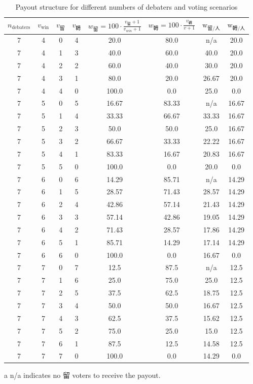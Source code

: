 \begin{table}[h]
    \centering
    \small
    \begin{threeparttable}
    \begin{tabular}{cccccccc}
    \toprule
    $n_{\text{debaters}}$ & $v_{\text{win}}$ & $v_{\text{留}}$ & $v_{\text{轉}}$ & $w_{\text{留}} = 100 \cdot \frac{v_{\text{留}}+1}{v_{win}+1} $ & $w_{\text{轉}} = 100\cdot\frac{v_{\text{轉}}}{v+1}$ & $\text{w}_{\text{留}/\text{人} }$ & $\text{w}_{\text{轉}/\text{人}}$ \\
    \midrule
7 & 4 & 0 & 4 & 20.0 & 80.0 & n/a\tnote{a} & 20.0 \\
7 & 4 & 1 & 3 & 40.0 & 60.0 & 40.0 & 20.0 \\
7 & 4 & 2 & 2 & 60.0 & 40.0 & 30.0 & 20.0 \\
7 & 4 & 3 & 1 & 80.0 & 20.0 & 26.67 & 20.0 \\
7 & 4 & 4 & 0 & 100.0 & 0.0 & 25.0 & 0.0 \\
7 & 5 & 0 & 5 & 16.67 & 83.33 & n/a\tnote{a} & 16.67 \\
7 & 5 & 1 & 4 & 33.33 & 66.67 & 33.33 & 16.67 \\
7 & 5 & 2 & 3 & 50.0 & 50.0 & 25.0 & 16.67 \\
7 & 5 & 3 & 2 & 66.67 & 33.33 & 22.22 & 16.67 \\
7 & 5 & 4 & 1 & 83.33 & 16.67 & 20.83 & 16.67 \\
7 & 5 & 5 & 0 & 100.0 & 0.0 & 20.0 & 0.0 \\
7 & 6 & 0 & 6 & 14.29 & 85.71 & n/a\tnote{a} & 14.29 \\
7 & 6 & 1 & 5 & 28.57 & 71.43 & 28.57 & 14.29 \\
7 & 6 & 2 & 4 & 42.86 & 57.14 & 21.43 & 14.29 \\
7 & 6 & 3 & 3 & 57.14 & 42.86 & 19.05 & 14.29 \\
7 & 6 & 4 & 2 & 71.43 & 28.57 & 17.86 & 14.29 \\
7 & 6 & 5 & 1 & 85.71 & 14.29 & 17.14 & 14.29 \\
7 & 6 & 6 & 0 & 100.0 & 0.0 & 16.67 & 0.0 \\
7 & 7 & 0 & 7 & 12.5 & 87.5 & n/a\tnote{a} & 12.5 \\
7 & 7 & 1 & 6 & 25.0 & 75.0 & 25.0 & 12.5 \\
7 & 7 & 2 & 5 & 37.5 & 62.5 & 18.75 & 12.5 \\
7 & 7 & 3 & 4 & 50.0 & 50.0 & 16.67 & 12.5 \\
7 & 7 & 4 & 3 & 62.5 & 37.5 & 15.62 & 12.5 \\
7 & 7 & 5 & 2 & 75.0 & 25.0 & 15.0 & 12.5 \\
7 & 7 & 6 & 1 & 87.5 & 12.5 & 14.58 & 12.5 \\
7 & 7 & 7 & 0 & 100.0 & 0.0 & 14.29 & 0.0 \\
\bottomrule
\end{tabular}
\begin{tablenotes}
    \item[a] n/a indicates no 留 voters to receive the payout.
\end{tablenotes}
\caption{Payout structure for different numbers of debaters and voting scenarios}
\end{threeparttable}
\end{table}


